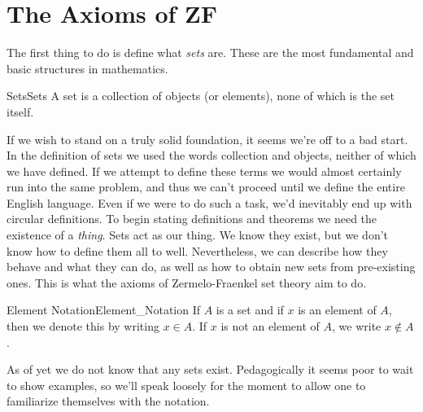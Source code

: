 \section{The Axioms of ZF}
    The first thing to do is define what \textit{sets} are. These are the
    most fundamental and basic structures in mathematics.
    \begin{fdefinition}{Sets}{Sets}
        A \gls{set} is a collection of objects (or elements),
        none of which is the set itself.
    \end{fdefinition}
    If we wish to stand on a truly solid foundation, it seems we're off to a
    bad start. In the definition of sets we used the words \textrm{collection}
    and \textrm{objects}, neither of which we have defined. If we attempt to
    define these terms we would almost certainly run into the same problem,
    and thus we can't proceed until we define the entire English language.
    Even if we were to do such a task, we'd inevitably end up with circular
    definitions. To begin stating definitions and theorems we need the
    existence of a \textit{thing}. Sets act as our thing. We know they exist,
    but we don't know how to define them all to well. Nevertheless, we can
    describe how they behave and what they can do, as well as how to obtain
    new sets from pre-existing ones. This is what the axioms of
    Zermelo-Fraenkel set theory aim to do.
    \begin{fnotation}{Element Notation}{Element_Notation}
        If $A$ is a set and if $x$ is an element of $A$, then we denote this
        by writing $x\in{A}$. If $x$ is not an element of $A$, we write
        $x\notin{A}$.
    \end{fnotation}
    As of yet we do not know that any sets exist. Pedagogically it seems poor
    to wait to show examples, so we'll speak loosely for the moment to allow
    one to familiarize themselves with the notation.
